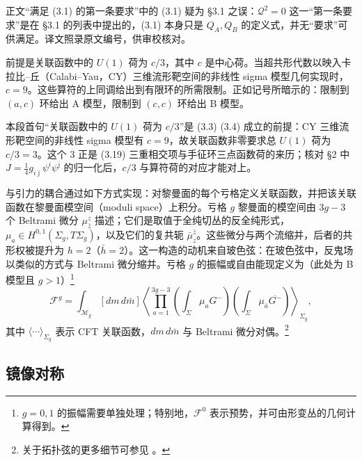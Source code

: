 \begin{yizhu}[原文疑误]
正文“满足 (3.1) 的第一条要求”中的 (3.1) 疑为 §3.1 之误：$\mathcal{Q}^2=0$ 这一“第一条要求”是在 §3.1 的列表中提出的，(3.1) 本身只是 $Q_A,Q_B$ 的定义式，并无“要求”可供满足。译文照录原文编号，供审校核对。
\end{yizhu}


前提是关联函数中的 $U(1)$ 荷为 $c/3$，其中 $c$ 是中心荷。当超共形代数以映入卡拉比--丘（Calabi--Yau，CY）三维流形靶空间的非线性 sigma 模型几何实现时，$c=9$。这些算符的上同调给出到有限环的所需限制。正如记号所暗示的：限制到 $(a,c)$ 环给出 A 模型，限制到 $(c,c)$ 环给出 B 模型。

\begin{yizhu}[易错点]
本段首句“关联函数中的 $U(1)$ 荷为 $c/3$”是 (3.3) (3.4) 成立的前提：CY 三维流形靶空间的非线性 sigma 模型有 $c=9$，故关联函数非零要求总 $U(1)$ 荷为 $c/3=3$。这个 $3$ 正是 (3.19) 三重相交项与手征环三点函数荷的来历；核对 §2 中 $J=\frac{1}{4}g_{i\bar\jmath}\psi^i\psi^{\bar\jmath}$ 的归一化后，$c/3$ 与算符荷的对应才能对上。
\end{yizhu}

与引力的耦合通过如下方式实现：对黎曼面的每个亏格定义关联函数，并把该关联函数在黎曼面模空间（moduli space）上积分。亏格 $g$ 黎曼面的模空间由 $3g-3$ 个 Beltrami 微分 $\mu^{z}_{\bar z}$ 描述；它们是取值于全纯切丛的反全纯形式，$\mu_a\in H^{0,1}(\Sigma_g,T\Sigma_g)$，以及它们的复共轭 $\bar\mu^{\bar z}_{z}$。这些微分与两个流缩并，后者的共形权被提升为 $h=2$（$\bar h=2$）。这一构造的动机来自玻色弦：在玻色弦中，反鬼场以类似的方式与 Beltrami 微分缩并。亏格 $g$ 的振幅或自由能现定义为（此处为 B 模型且 $g>1$）\footnote{$g=0,1$ 的振幅需要单独处理；特别地，$\mathcal{F}^0$ 表示预势，并可由形变丛的几何计算得到。}
\begin{equation}\tag{3.5}
\mathcal{F}^{g}=\int_{\mathcal{M}_g}[dm\,d\bar m]\left\langle
\prod_{a=1}^{3g-3}\left(\int_{\Sigma}\mu_a G^{-}\right)\left(\int_{\Sigma}\mu_{\bar a}\overline{G^{-}}\right)
\right\rangle_{\Sigma_g},
\end{equation}
其中 $\langle\cdots\rangle_{\Sigma_g}$ 表示 CFT 关联函数，$dm\,d\bar m$ 与 Beltrami 微分对偶。\footnote{关于拓扑弦的更多细节可参见 \cite{ref9,ref37,ref38,ref39,ref40,ref36,ref41}。}

\subsection{镜像对称}
\label{sec:3.3}

